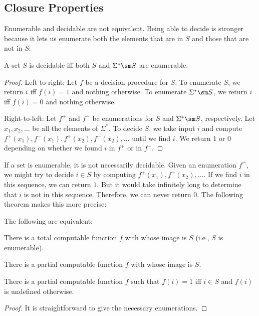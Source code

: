 \subsection{Closure Properties}\label{sec:comp:data:prop}

Enumerable and decidable are not equivalent.
Being able to decide is stronger because it lets us enumerate both the elements that are in $S$ and those that are not in $S$:

\begin{theorem}\label{thm:comp:enumdec}
A set $S$ is decidable iff both $S$ and $\Sigma^*\sm S$ are enumerable.
\end{theorem}
\begin{proof}
Left-to-right: Let $f$ be a decision procedure for $S$.
To enumerate $S$, we return $i$ iff $f(i)=1$ and nothing otherwise.
To enumerate $\Sigma^*\sm S$, we return $i$ iff $f(i)=0$ and nothing otherwise.

Right-to-left: Let $f^+$ and $f^-$ be enumerations for $S$ and $\Sigma^*\sm S$, respectively.
Let $x_1,x_2,\ldots$ be all the elements of $\Sigma^*$.
To decide $S$, we take input $i$ and compute $f^+(x_1),f^-(x_1),f^+(x_2),f^-(x_2),\ldots$ until we find $i$. We return $1$ or $0$ depending on whether we found $i$ in $f^+$ or in $f^-$.
\end{proof}

If a set is enumerable, it is not necessarily decidable.
Given an enumeration $f^+$, we might try to decide $i\in S$ by computing $f^+(x_1),f^+(x_2),\ldots$.
If we find $i$ in this sequence, we can return $1$.
But it would take infinitely long to determine that $i$ is not in this sequence.
Therefore, we can never return $0$.
The following theorem makes this more precise:

\begin{theorem}\label{thm:comp:enum}
The following are equivalent:
\begin{compactitem}
 \item There is a total computable function $f$ with whose image is $S$ (i.e., $S$ is enumerable).
 \item There is a partial computable function $f$ with whose image is $S$.
 \item There is a partial computable function $f$ such that $f(i)=1$ iff $i\in S$ and $f(i)$ is undefined otherwise.
\end{compactitem}
\end{theorem}
\begin{proof}
It is straightforward to give the necessary enumerations.
\end{proof}


